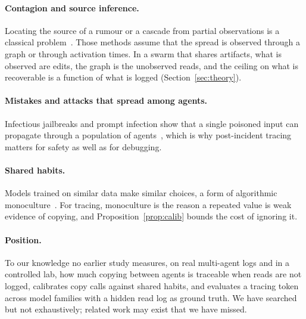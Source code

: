 \paragraph{Contagion and source inference.}
Locating the source of a rumour or a cascade from partial observations is a classical problem~\citep{shah2011rumors,gomezrodriguez2010inferring}. Those methods assume that the spread is observed through a graph or through activation times. In a swarm that shares artifacts, what is observed are edits, the graph is the unobserved reads, and the ceiling on what is recoverable is a function of what is logged (Section~\ref{sec:theory}).

\paragraph{Mistakes and attacks that spread among agents.}
Infectious jailbreaks and prompt infection show that a single poisoned input can propagate through a population of agents~\citep{gu2024agentsmith,lee2024prompt}, which is why post-incident tracing matters for safety as well as for debugging.

\paragraph{Shared habits.}
Models trained on similar data make similar choices, a form of algorithmic monoculture~\citep{kleinberg2021algorithmic}. For tracing, monoculture is the reason a repeated value is weak evidence of copying, and Proposition~\ref{prop:calib} bounds the cost of ignoring it.

\paragraph{Position.}
To our knowledge no earlier study measures, on real multi-agent logs and in a controlled lab, how much copying between agents is traceable when reads are not logged, calibrates copy calls against shared habits, and evaluates a tracing token across model families with a hidden read log as ground truth. We have searched but not exhaustively; related work may exist that we have missed.
